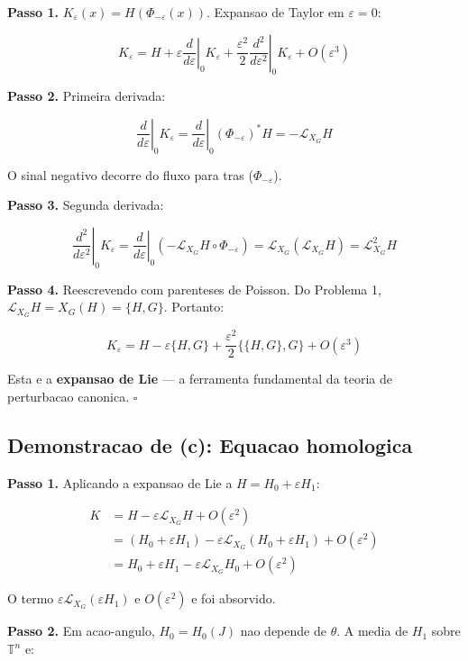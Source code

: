 \documentclass[12pt,a4paper,oneside]{article}
\begin{document}
\textbf{Passo 1.} $K_\varepsilon(x) = H(\Phi_{-\varepsilon}(x))$. Expansao
de Taylor em $\varepsilon = 0$:

$$K_\varepsilon = H + \varepsilon\left.\frac{d}{d\varepsilon}\right|_0
K_\varepsilon + \frac{\varepsilon^2}{2}\left.\frac{d^2}{d\varepsilon^2}
\right|_0 K_\varepsilon + O(\varepsilon^3)$$

\textbf{Passo 2.} Primeira derivada:

$$\left.\frac{d}{d\varepsilon}\right|_0 K_\varepsilon =
\left.\frac{d}{d\varepsilon}\right|_0 (\Phi_{-\varepsilon})^*H =
-\mathcal{L}_{X_G}H$$

O sinal negativo decorre do fluxo para tras ($\Phi_{-\varepsilon}$).

\textbf{Passo 3.} Segunda derivada:

$$\left.\frac{d^2}{d\varepsilon^2}\right|_0 K_\varepsilon =
\left.\frac{d}{d\varepsilon}\right|_0 \left(-\mathcal{L}_{X_G}H \circ
\Phi_{-\varepsilon}\right) = \mathcal{L}_{X_G}(\mathcal{L}_{X_G}H) =
\mathcal{L}^2_{X_G}H$$

\textbf{Passo 4.} Reescrevendo com parenteses de Poisson. Do Problema 1,
$\mathcal{L}_{X_G}H = X_G(H) = \{H, G\}$. Portanto:

$$\boxed{K_\varepsilon = H - \varepsilon\{H, G\} +
\frac{\varepsilon^2}{2}\{\{H, G\}, G\} + O(\varepsilon^3)}$$

Esta e a \textbf{expansao de Lie} — a ferramenta fundamental da teoria de
perturbacao canonica. $\square$

\subsection*{Demonstracao de (c): Equacao homologica}

\textbf{Passo 1.} Aplicando a expansao de Lie a $H = H_0 + \varepsilon H_1$:

\begin{align*}
K &= H - \varepsilon\mathcal{L}_{X_G}H + O(\varepsilon^2) \\
&= (H_0 + \varepsilon H_1) - \varepsilon\mathcal{L}_{X_G}(H_0 +
\varepsilon H_1) + O(\varepsilon^2) \\
&= H_0 + \varepsilon H_1 - \varepsilon\mathcal{L}_{X_G}H_0 +
O(\varepsilon^2)
\end{align*}

O termo $\varepsilon\mathcal{L}_{X_G}(\varepsilon H_1)$ e $O(\varepsilon^2)$
e foi absorvido.

\textbf{Passo 2.} Em acao-angulo, $H_0 = H_0(J)$ nao depende de $\theta$.
A media de $H_1$ sobre $\mathbb{T}^n$ e:
\end{document}
